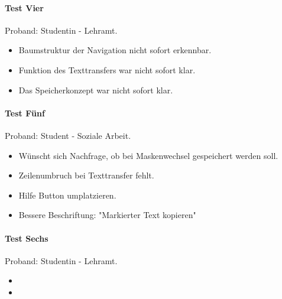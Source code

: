 \paragraph*{Test Vier}
Proband: Studentin - Lehramt.
\begin{itemize}
	\item Baumstruktur der Navigation nicht sofort erkennbar.
	\item Funktion des Texttransfers war nicht sofort klar.
	\item Das Speicherkonzept war nicht sofort klar.
\end{itemize}

\paragraph*{Test Fünf}
Proband: Student - Soziale Arbeit. 
\begin{itemize}
	\item Wünscht sich Nachfrage, ob bei Maskenwechsel gespeichert werden soll. 
	\item Zeilenumbruch bei Texttransfer fehlt. 
	\item Hilfe Button umplatzieren.
	\item Bessere Beschriftung: "Markierter Text kopieren"
\end{itemize}

\paragraph*{Test Sechs}
Proband: Studentin - Lehramt. 
\begin{itemize}
	\item  
	\item 
\end{itemize}
